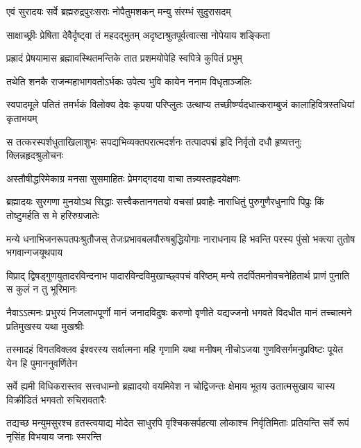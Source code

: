 

\twolineshloka
{एवं सुरादयः सर्वे ब्रह्मरुद्रपुरःसराः}
{नोपैतुमशकन् मन्यु संरम्भं सुदुरासदम्} %

\twolineshloka
{साक्षाच्छ्रीः प्रेषिता देवैर्दृष्ट्वा तं महदद्भुतम्}
{अदृष्टाश्रुतपूर्वत्वात्सा नोपेयाय शङ्किता} %

\twolineshloka
{प्रह्रादं प्रेषयामास ब्रह्मावस्थितमन्तिके}
{तात प्रशमयोपेहि स्वपित्रे कुपितं प्रभुम्} %

\twolineshloka
{तथेति शनकै राजन्महाभागवतोऽर्भकः}
{उपेत्य भुवि कायेन ननाम विधृताञ्जलिः} %

\fourlineindentedshloka
{स्वपादमूले पतितं तमर्भकं}
{विलोक्य देवः कृपया परिप्लुतः}
{उत्थाप्य तच्छीर्ष्ण्यदधात्कराम्बुजं}
{कालाहिवित्रस्तधियां कृताभयम्} %

\fourlineindentedshloka
{स तत्करस्पर्शधुताखिलाशुभः}
{सपद्यभिव्यक्तपरात्मदर्शनः}
{तत्पादपद्मं हृदि निर्वृतो दधौ}
{हृष्यत्तनुः क्लिन्नहृदश्रुलोचनः} %

\twolineshloka
{अस्तौषीद्धरिमेकाग्र मनसा सुसमाहितः}
{प्रेमगद्गदया वाचा तन्न्यस्तहृदयेक्षणः} %



\fourlineindentedshloka
{ब्रह्मादयः सुरगणा मुनयोऽथ सिद्धाः}
{सत्त्वैकतानगतयो वचसां प्रवाहैः}
{नाराधितुं पुरुगुणैरधुनापि पिप्रुः}
{किं तोष्टुमर्हति स मे हरिरुग्रजातेः} %

\fourlineindentedshloka
{मन्ये धनाभिजनरूपतपःश्रुतौजस्}
{तेजःप्रभावबलपौरुषबुद्धियोगाः}
{नाराधनाय हि भवन्ति परस्य पुंसो}
{भक्त्या तुतोष भगवान्गजयूथपाय} %

\fourlineindentedshloka
{विप्राद् द्विषड्गुणयुतादरविन्दनाभ}
{पादारविन्दविमुखाच्छ्वपचं वरिष्ठम्}
{मन्ये तदर्पितमनोवचनेहितार्थ}
{प्राणं पुनाति स कुलं न तु भूरिमानः} %

\fourlineindentedshloka
{नैवाऽऽत्मनः प्रभुरयं निजलाभपूर्णो}
{मानं जनादविदुषः करुणो वृणीते}
{यद्यज्जनो भगवते विदधीत मानं}
{तच्चात्मने प्रतिमुखस्य यथा मुखश्रीः} %

\fourlineindentedshloka
{तस्मादहं विगतविक्लव ईश्वरस्य}
{सर्वात्मना महि गृणामि यथा मनीषम्}
{नीचोऽजया गुणविसर्गमनुप्रविष्टः}
{पूयेत येन हि पुमाननुवर्णितेन} %

\fourlineindentedshloka
{सर्वे ह्यमी विधिकरास्तव सत्त्वधाम्नो}
{ब्रह्मादयो वयमिवेश न चोद्विजन्तः}
{क्षेमाय भूतय उतात्मसुखाय चास्य}
{विक्रीडितं भगवतो रुचिरावतारैः} %

\fourlineindentedshloka
{तद्यच्छ मन्युमसुरश्च हतस्त्वयाद्य}
{मोदेत साधुरपि वृश्चिकसर्पहत्या}
{लोकाश्च निर्वृतिमिताः प्रतियन्ति सर्वे}
{रूपं नृसिंह विभयाय जनाः स्मरन्ति} %

